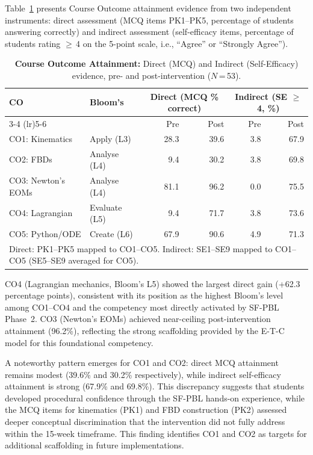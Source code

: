 \documentclass[utf8]{FrontiersinHarvard}
\begin{document}
Table~\ref{tab:coattain} presents Course Outcome attainment evidence from
two independent instruments: direct assessment (MCQ items PK1--PK5,
percentage of students answering correctly) and indirect assessment
(self-efficacy items, percentage of students rating $\geq$\,4 on the
5-point scale, i.e., ``Agree'' or ``Strongly Agree'').

\begin{table}[h]
\caption{\textbf{Course Outcome Attainment:} Direct (MCQ) and Indirect
(Self-Efficacy) evidence, pre- and post-intervention ($N$\,=\,53).}
\label{tab:coattain}
\begin{tabular}{llrrrr}
\toprule
\textbf{CO} & \textbf{Bloom's} &
\multicolumn{2}{c}{\textbf{Direct (MCQ \% correct)}} &
\multicolumn{2}{c}{\textbf{Indirect (SE $\geq$ 4, \%)}} \\
\cmidrule(lr){3-4} \cmidrule(lr){5-6}
 & & Pre & Post & Pre & Post \\
\midrule
CO1: Kinematics      & Apply (L3)    & 28.3 & 39.6  &  3.8 & 67.9 \\
CO2: FBDs            & Analyse (L4)  &  9.4 & 30.2  &  3.8 & 69.8 \\
CO3: Newton's EOMs   & Analyse (L4)  & 81.1 & 96.2  &  0.0 & 75.5 \\
CO4: Lagrangian      & Evaluate (L5) &  9.4 & 71.7  &  3.8 & 73.6 \\
CO5: Python/ODE      & Create (L6)   & 67.9 & 90.6  &  4.9 & 71.3 \\
\bottomrule
\multicolumn{6}{l}{\small Direct: PK1--PK5 mapped to CO1--CO5.
Indirect: SE1--SE9 mapped to CO1--CO5 (SE5--SE9 averaged for CO5).}
\end{tabular}
\end{table}

CO4 (Lagrangian mechanics, Bloom's L5) showed the largest direct gain
(+62.3 percentage points), consistent with its position as the highest
Bloom's level among CO1--CO4 and the competency most directly activated by
SF-PBL Phase~2. CO3 (Newton's EOMs) achieved near-ceiling post-intervention
attainment (96.2\%), reflecting the strong scaffolding provided by the E-T-C
model for this foundational competency.

A noteworthy pattern emerges for CO1 and CO2: direct MCQ attainment
remains modest (39.6\% and 30.2\% respectively), while indirect
self-efficacy attainment is strong (67.9\% and 69.8\%). This discrepancy
suggests that students developed procedural confidence through the SF-PBL
hands-on experience, while the MCQ items for kinematics (PK1) and FBD
construction (PK2) assessed deeper conceptual discrimination that the
intervention did not fully address within the 15-week timeframe. This
finding identifies CO1 and CO2 as targets for additional scaffolding in
future implementations.
\end{document}
